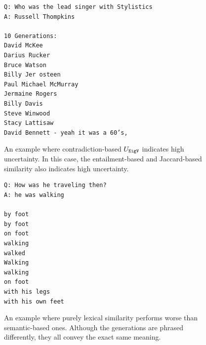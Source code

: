 \begin{figure}[htb]
  \centering
  \begin{minipage}{\textwidth}
  {\small
        \begin{verbatim}
Q: Who was the lead singer with Stylistics
A: Russell Thompkins

10 Generations:
David McKee
Darius Rucker
Bruce Watson
Billy Jer osteen
Paul Michael McMurray
Jermaine Rogers
Billy Davis
Steve Winwood
Stacy Lattisaw
David Bennett - yeah it was a 60’s,
        \end{verbatim}
}
  \end{minipage}
  \caption{An example where contradiction-based $U_{\texttt{EigV}}$ indicates high uncertainty. %
  In this case, the entailment-based and Jaccard-based similarity also indicates high uncertainty. %
  }
  \label{example:highcontra}
\end{figure}






\begin{figure}[htb]
  \centering
  \begin{minipage}{\textwidth}
  {\small
        \begin{verbatim}
Q: How was he traveling then?
A: he was walking

by foot
by foot
on foot
walking
walked
Walking
walking
on foot
with his legs
with his own feet
        \end{verbatim}
}
  \end{minipage}
  \caption{An example where purely lexical similarity performs worse than semantic-based ones. 
  Although the generations are phrased differently, they all convey the exact same meaning.
  }
  \label{example:lexicalbad}
\end{figure}
